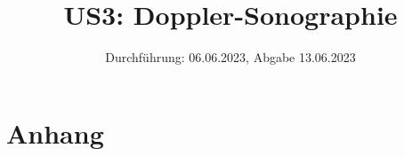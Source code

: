 

\title{US3: Doppler-Sonographie}
\date{Durchführung: 06.06.2023, Abgabe 13.06.2023}


\maketitle
\thispagestyle{empty} 
\tableofcontents
\newpage
\setcounter{page}{1}






\printbibliography
\newpage

\section*{Anhang}


